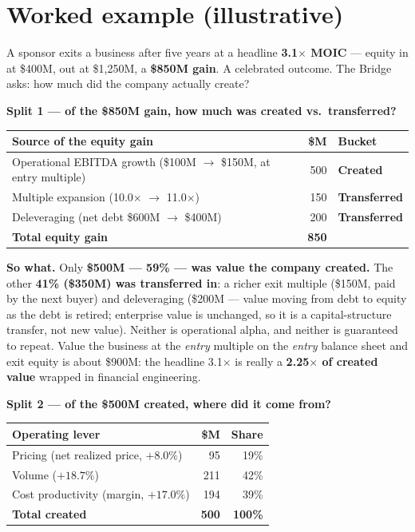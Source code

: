 \documentclass[11pt]{article}
\newcommand{\created}{\textcolor{creoaccent}{\textbf{Created}}}
\newcommand{\transferred}{\textcolor{gray!55!black}{\textbf{Transferred}}}
\begin{document}
\section{Worked example (illustrative)}
A sponsor exits a business after five years at a headline \textbf{3.1$\times$ MOIC} ---
equity in at \$400M, out at \$1{,}250M, a \textbf{\$850M gain}. A celebrated outcome. The
Bridge asks: how much did the company actually create?

\smallskip
\textbf{Split 1 --- of the \$850M gain, how much was created vs.\ transferred?}
\begin{center}
\renewcommand{\arraystretch}{1.25}\small
\begin{tabular}{l r l}
\toprule
\textbf{Source of the equity gain} & \textbf{\$M} & \textbf{Bucket} \\
\midrule
Operational EBITDA growth (\$100M $\rightarrow$ \$150M, at entry multiple) & 500 & \created \\
Multiple expansion (10.0$\times$ $\rightarrow$ 11.0$\times$) & 150 & \transferred \\
Deleveraging (net debt \$600M $\rightarrow$ \$400M) & 200 & \transferred \\
\midrule
\textbf{Total equity gain} & \textbf{850} & \\
\bottomrule
\end{tabular}
\end{center}

\begin{sowhat}
\textbf{So what.} Only \textbf{\$500M --- 59\% --- was value the company created.} The other
\textbf{41\% (\$350M) was transferred in}: a richer exit multiple (\$150M, paid by the next
buyer) and deleveraging (\$200M --- value moving from debt to equity as the debt is retired;
enterprise value is unchanged, so it is a capital-structure transfer, not new value). Neither
is operational alpha, and neither is guaranteed to repeat. Value the business at the
\emph{entry} multiple on the \emph{entry} balance sheet and exit equity is about \$900M: the
headline 3.1$\times$ is really a \textbf{2.25$\times$ of created value} wrapped in financial
engineering.
\end{sowhat}

\textbf{Split 2 --- of the \$500M created, where did it come from?}
\begin{center}
\renewcommand{\arraystretch}{1.25}\small
\begin{tabular}{l r r}
\toprule
\textbf{Operating lever} & \textbf{\$M} & \textbf{Share} \\
\midrule
Pricing (net realized price, $+8.0\%$)        &  95 & 19\% \\
Volume ($+18.7\%$)                            & 211 & 42\% \\
Cost productivity (margin, $+17.0\%$)         & 194 & 39\% \\
\midrule
\textbf{Total created} & \textbf{500} & \textbf{100\%} \\
\bottomrule
\end{tabular}
\end{center}
\end{document}
